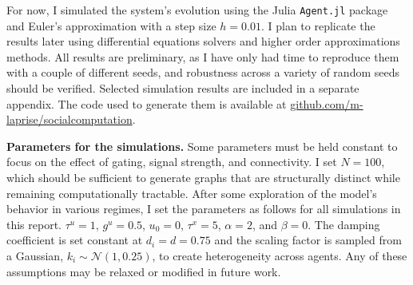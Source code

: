 \documentclass[]{article}
\begin{document}
For now, I simulated the system's evolution using the Julia \texttt{Agent.jl} package and Euler's approximation with a step size $h = 0.01$. I plan to replicate the results later using differential equations solvers and higher order approximations methods. All results are preliminary, as I have only had time to reproduce them with a couple of different seeds, and robustness across a variety of random seeds should be verified. Selected simulation results are included in a separate appendix. The code used to generate them is available at \href{http://github.com/m-laprise/socialcomputation}{github.com/m-laprise/socialcomputation}.

\textbf{Parameters for the simulations.} Some parameters must be held constant to focus on the effect of gating, signal strength, and connectivity. I set $N = 100$, which should be sufficient to generate graphs that are structurally distinct while remaining computationally tractable. After some exploration of the model's behavior in various regimes, I set the parameters as follows for all simulations in this report. $\tau^u = 1$, $g^u = 0.5$, $u_0=0$, $\tau^x = 5$, $\alpha = 2$, and $\beta = 0$. The damping coefficient is set constant at $d_i = d = 0.75$ and the scaling factor is sampled from a Gaussian, $k_i \sim \mathcal{N}(1,0.25)$, to create heterogeneity across agents. Any of these assumptions may be relaxed or modified in future work. 
\end{document}

